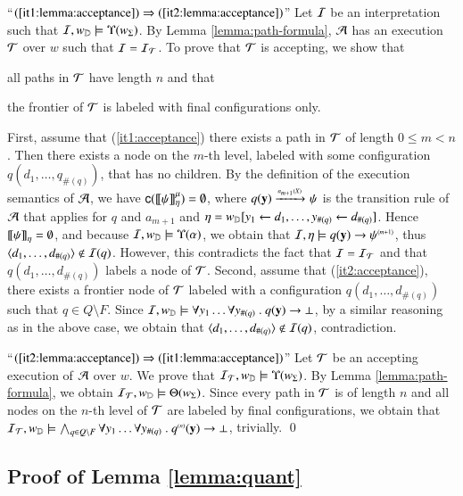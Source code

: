 ``$(\ref{it1:lemma:acceptance}) \Rightarrow
(\ref{it2:lemma:acceptance})$'' Let $\mathcal{I}$ be an interpretation such
that $\mathcal{I},{w}_{\mathbb{D}} \models \Upsilon({{w}_\Sigma})$. By Lemma
\ref{lemma:path-formula}, $\mathcal{A}$ has an execution $\mathcal{T}$ over $w$ such
that $\mathcal{I} = \mathcal{I}_{\mathcal{T}}$. To prove that $\mathcal{T}$ is accepting, we show
that \begin{inparaenum}[(i)]
\item\label{it1:acceptance} all paths in $\mathcal{T}$ have length $n$ and
  that
\item\label{it2:acceptance} the frontier of $\mathcal{T}$ is labeled with final
  configurations only. \end{inparaenum} First, assume that
(\ref{it1:acceptance}) there exists a path in $\mathcal{T}$ of length $0 \leq m
< n$. Then there exists a node on the $m$-th level, labeled with some
configuration $q(d_1,\ldots,q_{\#(q)})$, that has no children. By the
definition of the execution semantics of $\mathcal{A}$, we have
$\mathsf{c}({{\bf [\![} \psi {\bf ]\!]}^\mu_{\eta}}) = \emptyset$, where $q(\mathbf y)
\xrightarrow{{\scriptscriptstyle a_{m+1}(X)}}_{{\scriptstyle }} \psi$ is the transition rule of $\mathcal{A}$ that applies
for $q$ and $a_{m+1}$ and $\eta= {w}_{\mathbb{D}}[y_1 \leftarrow
  d_1,\ldots,y_{\#(q)} \leftarrow d_{\#(q)}]$. Hence
${\bf [\![} \psi {\bf ]\!]}_{\eta} = \emptyset$, and because $\mathcal{I},{w}_{\mathbb{D}} \models
\Upsilon({\alpha})$, we obtain that $\mathcal{I},\eta \models q(\mathbf y)
\rightarrow {\psi}^{\scriptscriptstyle{({m+1})}}$, thus $\langle d_1,\ldots,d_{\#(q)} \rangle
\not\in \mathcal{I}(q)$. However, this contradicts the fact that $\mathcal{I}=\mathcal{I}_{\mathcal{T}}$
and that $q(d_1,\ldots,d_{\#(q)})$ labels a node of $\mathcal{T}$. Second,
assume that (\ref{it2:acceptance}), there exists a frontier node of
$\mathcal{T}$ labeled with a configuration $q(d_1,\ldots,d_{\#(q)})$ such that
$q \in Q \setminus F$. Since $\mathcal{I},{w}_{\mathbb{D}} \models \forall y_1 \ldots
\forall y_{\#(q)} ~.~ q(\mathbf y) \rightarrow \bot$, by a similar
reasoning as in the above case, we obtain that
$\langle d_1,\ldots,d_{\#(q)} \rangle \not\in \mathcal{I}(q)$, contradiction.

``$(\ref{it2:lemma:acceptance}) \Rightarrow
(\ref{it1:lemma:acceptance})$'' Let $\mathcal{T}$ be an accepting execution of
$\mathcal{A}$ over $w$. We prove that $\mathcal{I}_{\mathcal{T}},{w}_{\mathbb{D}} \models
\Upsilon({{w}_\Sigma})$. By Lemma \ref{lemma:path-formula}, we obtain
$\mathcal{I}_{\mathcal{T}},{w}_{\mathbb{D}} \models \Theta({{w}_\Sigma})$. Since every path in
$\mathcal{T}$ is of length $n$ and all nodes on the $n$-th level of $\mathcal{T}$ are
labeled by final configurations, we obtain that $\mathcal{I}_{\mathcal{T}},{w}_{\mathbb{D}}
\models \bigwedge_{q \in Q \setminus F} \forall y_1 \ldots \forall
y_{\#(q)} ~.~ {q}^{\scriptscriptstyle{({n})}}(\mathbf y) \rightarrow \bot$, trivially.
\qed

\subsection{Proof of Lemma \ref{lemma:quant}}

